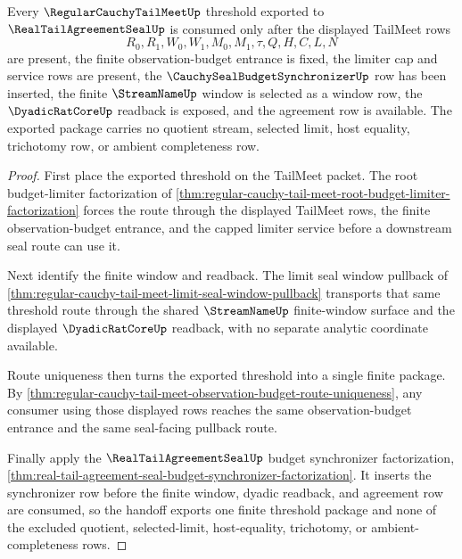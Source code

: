 \begin{theorem}
\label{thm:regular-cauchy-tail-meet-real-tail-agreement-handoff}
Every $\RegularCauchyTailMeetUp$ threshold exported to $\RealTailAgreementSealUp$ is consumed only after the displayed TailMeet rows
$$
R_0,R_1,W_0,W_1,M_0,M_1,\tau,Q,H,C,L,N
$$
are present, the finite observation-budget entrance is fixed, the limiter cap and service rows are present, the $\CauchySealBudgetSynchronizerUp$ row has been inserted, the finite $\StreamNameUp$ window is selected as a window row, the $\DyadicRatCoreUp$ readback is exposed, and the agreement row is available. The exported package carries no quotient stream, selected limit, host equality, trichotomy row, or ambient completeness row.
\end{theorem}
\begin{proof}
First place the exported threshold on the TailMeet packet. The root budget-limiter factorization of \autoref{thm:regular-cauchy-tail-meet-root-budget-limiter-factorization} forces the route through the displayed TailMeet rows, the finite observation-budget entrance, and the capped limiter service before a downstream seal route can use it.

Next identify the finite window and readback. The limit seal window pullback of \autoref{thm:regular-cauchy-tail-meet-limit-seal-window-pullback} transports that same threshold route through the shared $\StreamNameUp$ finite-window surface and the displayed $\DyadicRatCoreUp$ readback, with no separate analytic coordinate available.

Route uniqueness then turns the exported threshold into a single finite package. By \autoref{thm:regular-cauchy-tail-meet-observation-budget-route-uniqueness}, any consumer using those displayed rows reaches the same observation-budget entrance and the same seal-facing pullback route.

Finally apply the $\RealTailAgreementSealUp$ budget synchronizer factorization, \autoref{thm:real-tail-agreement-seal-budget-synchronizer-factorization}. It inserts the synchronizer row before the finite window, dyadic readback, and agreement row are consumed, so the handoff exports one finite threshold package and none of the excluded quotient, selected-limit, host-equality, trichotomy, or ambient-completeness rows.
\end{proof}
